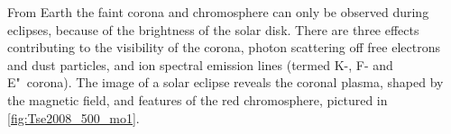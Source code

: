 From Earth the faint corona and chromosphere can only be observed during eclipses, because of the brightness of the solar disk. There are three effects contributing to the visibility of the corona, photon scattering off free electrons and dust particles, and ion spectral emission lines (termed K-, F- and E"~corona).
The image of a solar eclipse reveals the coronal plasma, shaped by the magnetic field, and features of the red chromosphere, pictured in \autoref{fig:Tse2008_500_mo1}.\\
\begin{figure}[htb]
\end{figure}

